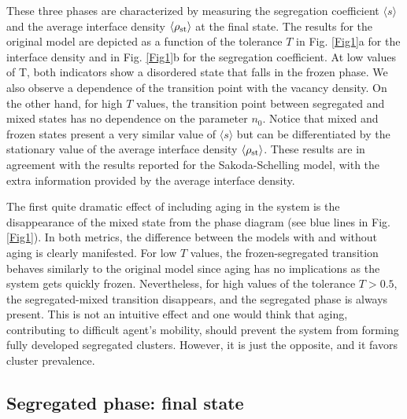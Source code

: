 These three phases are characterized by measuring the segregation coefficient $\langle s \rangle$ and the average interface density $\langle\rho_{\rm{st}} \rangle$ at the final state. The results for the original model are depicted as a function of the tolerance $T$ in Fig. \ref{Fig1}a for the interface density and in Fig. \ref{Fig1}b for the segregation coefficient. At low values of T, both indicators show a disordered state that falls in the frozen phase.  We also observe a dependence of the transition point with the vacancy density. On the other hand, for high $T$ values, the transition point between segregated and mixed states has no dependence on the parameter $n_0$. Notice that mixed and frozen states present a very similar value of $\langle s \rangle$ but can be differentiated by the stationary value of the average interface density $\langle\rho_{\rm{st}} \rangle$. These results are in agreement with the results reported for the Sakoda-Schelling model\cite{Gauvin_2009}, with the extra information provided by the average interface density.

The first quite dramatic effect of including aging in the system is the disappearance of the mixed state from the phase diagram (see blue lines in Fig. \ref{Fig1}). In both metrics, the difference between the models with and without aging is clearly manifested. For low $T$ values, the frozen-segregated transition behaves similarly to the original model since aging has no implications as the system gets quickly frozen. Nevertheless, for high values of the tolerance $T> 0.5$, the segregated-mixed transition disappears, and the segregated phase is always present. This is not an intuitive effect and one would think that aging, contributing to difficult agent's mobility, should prevent the system from forming fully developed segregated clusters. However, it is just the opposite, and it favors cluster prevalence.

\subsection{Segregated phase: final state}

